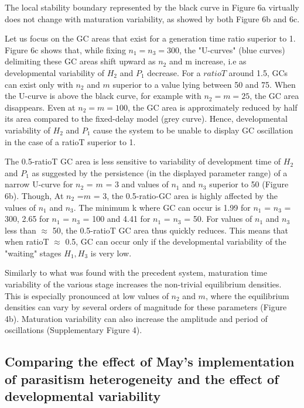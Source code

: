 \documentclass[12pt,a4paper,onecolumn]{article}
\begin{document}
\tabto{1 cm} The local stability boundary represented by the black curve in Figure 6a virtually does not change with maturation variability, as showed by both Figure 6b and 6c.

\tabto{1 cm} Let us focus on the GC areas that exist for a generation time ratio superior to 1. Figure 6c shows that, while fixing $n_1 =  n_3 = 300$,  the "U-curves" (blue curves) delimiting these GC areas shift upward as $n_2$ and m increase, i.e as developmental variability of $H_2$ and $P_1$ decrease. For a $ratioT$ around 1.5, GCs can exist only with $n_2$ and $m$ superior to a value lying between 50 and 75. When the U-curve is above the black curve, for example with $n_2 = m = 25$, the GC area disappears. Even at $n_2 = m = 100$, the GC area is approximately reduced by half its area compared to the fixed-delay model (grey curve). Hence, developmental variability of $H_2$ and $P_1$ cause the system to be unable to display GC oscillation in the case of a ratioT superior to 1. 

\tabto{1 cm} The 0.5-ratioT GC area is less sensitive to variability of development time of $H_2$ and $P_1$ as suggested by the persistence (in the displayed parameter range) of a narrow U-curve for $n_2$ = $m$ = 3 and values of $n_1$ and $n_3$ superior to 50 (Figure 6b). Though, At $n_2$ =$m$ = 3, the 0.5-ratio-GC area is highly affected by the values of $n_1$ and $n_3$. The minimum k where GC can occur is 1.99 for $n_1$ = $n_3$ = 300, 2.65 for $n_1$ = $n_3$ = 100 and 4.41 for $n_1$ = $n_3$ = 50.  For values of $n_1$ and $n_3$ less than $\approx$ 50, the 0.5-ratioT GC area thus quickly reduces. This means that when ratioT $\approx$ 0.5, GC can occur only if the developmental variability of the "waiting" stages $H_1, H_3$ is very low. 

\tabto{1 cm} Similarly to what was found with the precedent system, maturation time variability of the various stage increases the non-trivial equilibrium densities. This is especially pronounced at low values of $n_2$ and $m$, where the equilibrium densities can vary by several orders of magnitude for these parameters (Figure 4b). Maturation variability can also increase the amplitude and period of oscillations (Supplementary Figure 4).

\subsection{Comparing the effect of May's implementation of parasitism heterogeneity and the effect of developmental variability}
\end{document}
